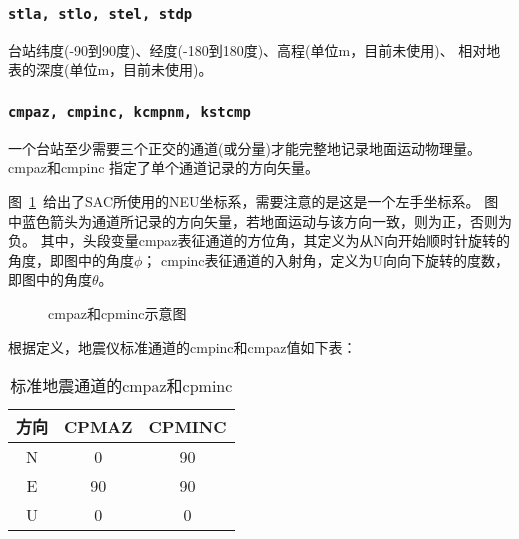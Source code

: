 \subsubsection{\texttt{stla, stlo, stel, stdp}}
台站纬度(-90到90度)、经度(-180到180度)、高程(单位m，目前未使用)、
相对地表的深度(单位m，目前未使用)。

\subsubsection{\texttt{cmpaz, cmpinc, kcmpnm, kstcmp}}
一个台站至少需要三个正交的通道(或分量)才能完整地记录地面运动物理量。cmpaz和cmpinc
指定了单个通道记录的方向矢量。

图~\ref{fig:cmpaz-cmpinc}~给出了SAC所使用的NEU坐标系，需要注意的是这是一个左手坐标系。
图中蓝色箭头为通道所记录的方向矢量，若地面运动与该方向一致，则为正，否则为负。
其中，头段变量cmpaz表征通道的方位角，其定义为从N向开始顺时针旋转的角度，即图中的角度$\phi$；
cmpinc表征通道的入射角，定义为U向向下旋转的度数，即图中的角度$\theta$。

\begin{figure}[H]
\centering
{}
\caption{cmpaz和cpminc示意图}
\label{fig:cmpaz-cmpinc}
\end{figure}

根据定义，地震仪标准通道的cmpinc和cmpaz值如下表：
\begin{table}[H]
\caption{标准地震通道的cmpaz和cpminc}
\label{table:neu-cmpaz-cmpinc}
\centering
\begin{tabular}{ccc}
\toprule
方向    &   CPMAZ   &   CPMINC      \\
\midrule
N       &   0       &   90          \\
E       &   90      &   90          \\
U       &   0       &   0           \\
\bottomrule
\end{tabular}
\end{table}


